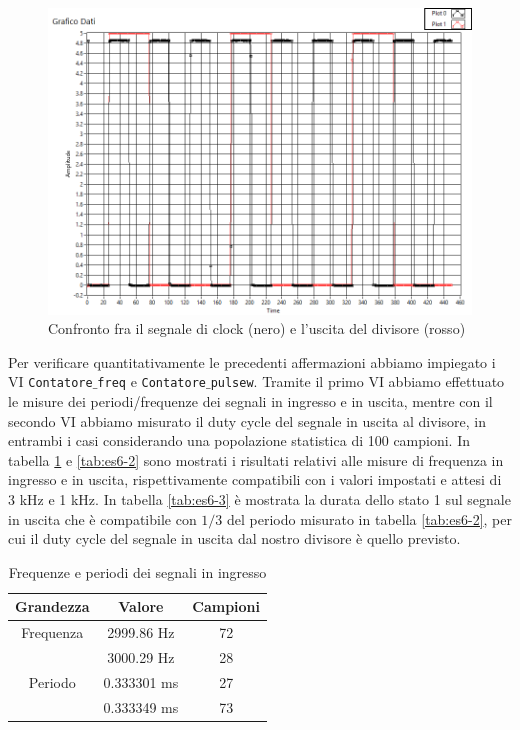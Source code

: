 \documentclass[journal, a4paper]{IEEEtran}
\begin{document}
\begin{figure}[htp]
\centering
\includegraphics[scale=.25]{es7_sym}
\caption{Confronto fra il segnale di clock (nero) e l'uscita del divisore (rosso)}
\label{fig:vi}
\end{figure}

Per verificare quantitativamente le precedenti affermazioni abbiamo impiegato i VI \texttt{Contatore$\_$freq} e \texttt{Contatore$\_$pulsew}. Tramite il primo VI abbiamo effettuato le misure dei periodi/frequenze dei segnali in ingresso e in uscita, mentre con il secondo VI abbiamo misurato il duty cycle del segnale in uscita al divisore, in entrambi i casi considerando una popolazione statistica di 100 campioni. In tabella \ref{tab:es6-1} e \ref{tab:es6-2} sono mostrati i risultati relativi alle misure di frequenza in ingresso e in uscita, rispettivamente compatibili con i valori impostati e attesi di 3 kHz e 1 kHz. In tabella \ref{tab:es6-3} è mostrata la durata dello stato 1 sul segnale in uscita che è compatibile con $1/3$ del periodo misurato in tabella \ref{tab:es6-2}, per cui il duty cycle del segnale in uscita dal nostro divisore è quello previsto.

\begin{table}[htp]
\centering
\caption{Frequenze e periodi dei segnali in ingresso}
\label{tab:es6-1}
\begin{tabular}{|c|c|c|}
\hline
Grandezza & Valore & Campioni\\
\hline 
Frequenza & 2999.86 Hz & 72 \\ \cline{2-3}
          & 3000.29 Hz & 28 \\ 
\hline 
Periodo & 0.333301 ms & 27 \\ \cline{2-3}
        & 0.333349 ms & 73 \\ 
\hline 
\end{tabular} 
\end{table}
\end{document}
